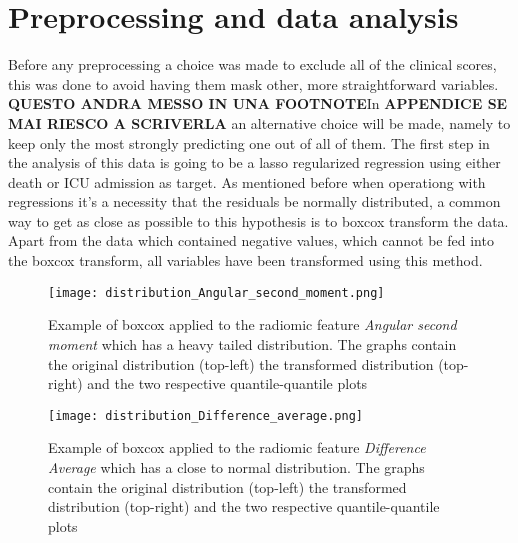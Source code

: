 \section{Preprocessing and data analysis}
Before any preprocessing a choice was made to exclude all of the clinical scores, this was done to avoid having them mask other, more straightforward variables. \textbf{QUESTO ANDRA MESSO IN UNA FOOTNOTE}In \textbf{APPENDICE SE MAI RIESCO A SCRIVERLA} an alternative choice will be made, namely to keep only the most strongly predicting one out of all of them.
The first step in the analysis of this data is going to be a lasso regularized regression using either death or ICU admission as target. As mentioned before when operationg with regressions it's a necessity that the residuals be normally distributed, a common way to get as close as possible to this hypothesis is to boxcox transform the data. Apart from the data which contained negative values, which cannot be fed into the boxcox transform, all variables have been transformed using this method.

\begin{figure}[htbp]
  		\texttt{[image: distribution\_Angular\_second\_moment.png]}
        \caption{Example of boxcox applied to the radiomic feature \textit{Angular second moment} which has a heavy tailed distribution. The graphs contain the original distribution (top-left) the transformed distribution (top-right) and the two respective quantile-quantile plots \label{fig:boxcox_example}}
\end{figure}

\begin{figure}[htbp]
  		\texttt{[image: distribution\_Difference\_average.png]}
        \caption{Example of boxcox applied to the radiomic feature \textit{Difference Average} which has a close to normal distribution. The graphs contain the original distribution (top-left) the transformed distribution (top-right) and the two respective quantile-quantile plots \label{fig:boxcox_example_normal}}
\end{figure}


